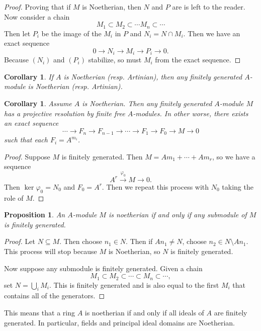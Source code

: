 \documentclass[leqno, openany]{memoir}
\newtheorem{cor}[thm]{Corollary}
\newtheorem{prop}[thm]{Proposition}
\theoremstyle{definition}
\theoremstyle{remark}
\theoremstyle{plain}
\theoremstyle{definition}
\theoremstyle{remark}
\begin{document}
\begin{proof}
    Proving that if $M$ is Noetherian, then $N$ and $P$ are is left to the reader. Now consider a chain
    \[ M_1 \subset M_2 \subset \cdots M_n \subset \cdots \]
    Then let $P_i$ be the image of the $M_i$ in $P$ and $N_i = N \cap M_i$. Then we have an exact sequence
    \[ 0 \to N_i \to M_i \to P_i \to 0. \]
    Because $(N_i)$ and $(P_i)$ stabilize, so must $M_i$ from the exact sequence.
\end{proof}

\begin{cor}
    If $A$ is Noetherian (resp. Artinian), then any finitely generated $A$-module is Noetherian (resp. Artinian).
\end{cor}

\begin{cor}
    Assume $A$ is Noetherian. Then any finitely generated $A$-module $M$ has a projective resolution by finite free $A$-modules. In other worse, there exists an exact sequence 
    \[ \cdots \to F_n \to F_{n-1} \to \cdots \to F_1 \to F_0 \to M \to 0 \]
    such that each $F_i = A^{m_i}$.
\end{cor}

\begin{proof}
    Suppose $M$ is finitely generated. Then $M = A m_1 + \cdots + A m_r$, so we have a sequence
    \[ A^r \xrightarrow{\varphi_0} M \to 0. \]
    Then $\ker \varphi_0 = N_0$ and $F_0 = A^r$. Then we repeat this process with $N_0$ taking the role of $M$.
\end{proof}

\begin{prop}
    An $A$-module $M$ is noetherian if and only if any submodule of $M$ is finitely generated.
\end{prop}

\begin{proof}
    Let $N \subseteq M$. Then choose $n_1 \in N$. Then if $A n_1 \neq N$, choose $n_2 \in N \setminus A n_1$. This process will stop because $M$ is Noetherian, so $N$ is finitely generated.

    Now suppose any submodule is finitely generated. Given a chain
    \[ M_1 \subset M_2 \subset \cdots \subset M_n \subset \cdots, \]
    set $N = \bigcup_i M_i$. This is finitely generated and is also equal to the first $M_i$ that contains all of the generators.
\end{proof}

This means that a ring $A$ is noetherian if and only if all ideals of $A$ are finitely generated. In particular, fields and principal ideal domains are Noetherian.
\end{document}
